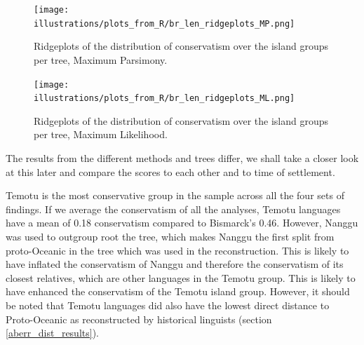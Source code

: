 \documentclass[draft,10pt]{article} %
\begin{document}

\begin{figure}
\centering
\texttt{[image: illustrations/plots\_from\_R/br\_len\_ridgeplots\_MP.png]}
\caption{{Ridgeplots of the distribution of conservatism over the island groups per tree, Maximum Parsimony.}}
\label{ridgeplot_BR_len_MP}
\end{figure}


\begin{figure}
\centering
\texttt{[image: illustrations/plots\_from\_R/br\_len\_ridgeplots\_ML.png]}
\caption{{Ridgeplots of the distribution of conservatism over the island groups per tree, Maximum Likelihood.}}
\label{ridgeplot_BR_len_ML}
\end{figure}

The results from the different methods and trees differ, we shall take a closer look at this later and compare the scores to each other and to time of settlement.

Temotu is the most conservative group in the sample across all the four sets of findings. If we average the conservatism of all the analyses, Temotu languages have a mean of 0.18 conservatism compared to Bismarck's 0.46. However, Nanggu was used to outgroup root the tree, which makes Nanggu the first split from proto-Oceanic in the tree which was used in the reconstruction. This is likely to have inflated the conservatism of Nanggu and therefore the conservatism of its closest relatives, which are other languages in the Temotu group. This is likely to have enhanced the conservatism of the Temotu island group. However, it should be noted that Temotu languages did also have the lowest direct distance to Proto-Oceanic as reconstructed by historical linguists (section \ref{aberr_dist_results}).
\end{document}
